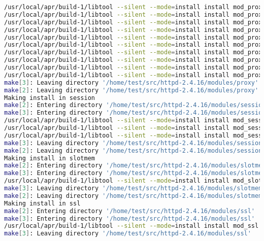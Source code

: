 \begin{lstlisting}[language=bash]
/usr/local/apr/build-1/libtool --silent --mode=install install mod_proxy.la /usr/local/apache2/modules/
/usr/local/apr/build-1/libtool --silent --mode=install install mod_proxy_connect.la /usr/local/apache2/modules/
/usr/local/apr/build-1/libtool --silent --mode=install install mod_proxy_ftp.la /usr/local/apache2/modules/
/usr/local/apr/build-1/libtool --silent --mode=install install mod_proxy_http.la /usr/local/apache2/modules/
/usr/local/apr/build-1/libtool --silent --mode=install install mod_proxy_fcgi.la /usr/local/apache2/modules/
/usr/local/apr/build-1/libtool --silent --mode=install install mod_proxy_scgi.la /usr/local/apache2/modules/
/usr/local/apr/build-1/libtool --silent --mode=install install mod_proxy_wstunnel.la /usr/local/apache2/modules/
/usr/local/apr/build-1/libtool --silent --mode=install install mod_proxy_ajp.la /usr/local/apache2/modules/
/usr/local/apr/build-1/libtool --silent --mode=install install mod_proxy_balancer.la /usr/local/apache2/modules/
/usr/local/apr/build-1/libtool --silent --mode=install install mod_proxy_express.la /usr/local/apache2/modules/
make[3]: Leaving directory '/home/test/src/httpd-2.4.16/modules/proxy'
make[2]: Leaving directory '/home/test/src/httpd-2.4.16/modules/proxy'
Making install in session
make[2]: Entering directory '/home/test/src/httpd-2.4.16/modules/session'
make[3]: Entering directory '/home/test/src/httpd-2.4.16/modules/session'
/usr/local/apr/build-1/libtool --silent --mode=install install mod_session.la /usr/local/apache2/modules/
/usr/local/apr/build-1/libtool --silent --mode=install install mod_session_cookie.la /usr/local/apache2/modules/
/usr/local/apr/build-1/libtool --silent --mode=install install mod_session_dbd.la /usr/local/apache2/modules/
make[3]: Leaving directory '/home/test/src/httpd-2.4.16/modules/session'
make[2]: Leaving directory '/home/test/src/httpd-2.4.16/modules/session'
Making install in slotmem
make[2]: Entering directory '/home/test/src/httpd-2.4.16/modules/slotmem'
make[3]: Entering directory '/home/test/src/httpd-2.4.16/modules/slotmem'
/usr/local/apr/build-1/libtool --silent --mode=install install mod_slotmem_shm.la /usr/local/apache2/modules/
make[3]: Leaving directory '/home/test/src/httpd-2.4.16/modules/slotmem'
make[2]: Leaving directory '/home/test/src/httpd-2.4.16/modules/slotmem'
Making install in ssl
make[2]: Entering directory '/home/test/src/httpd-2.4.16/modules/ssl'
make[3]: Entering directory '/home/test/src/httpd-2.4.16/modules/ssl'
/usr/local/apr/build-1/libtool --silent --mode=install install mod_ssl.la /usr/local/apache2/modules/
make[3]: Leaving directory '/home/test/src/httpd-2.4.16/modules/ssl'

\end{lstlisting}
